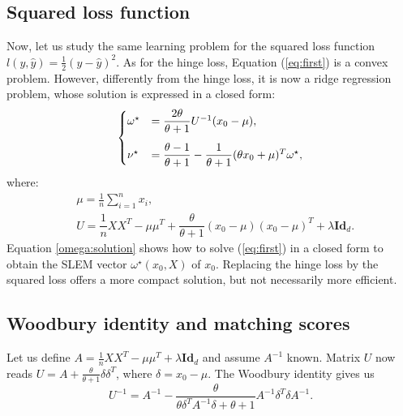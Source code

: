 \subsection{Squared loss function}\label{SLEM}
Now, let us study the same learning problem for the squared loss function $l(y,\hat{y}) = \frac{1}{2}(y-\hat{y})^2$. As for the hinge loss, Equation (\ref{eq:first}) is a convex problem. 
However, differently from the hinge loss, it is now a ridge regression problem, whose solution is expressed in a closed form:
\begin{align}
\begin{cases}
\vspace{3 mm}
\omega^\star &= \dfrac{2\theta}{\theta+1}U^{-1}(x_0-\mu), \\
\nu^\star &= \dfrac{\theta-1}{\theta+1}-\dfrac{1}{\theta+1}(\theta x_0+\mu)^T\omega^\star,
\end{cases}
\label{omega:solution}
\end{align}
where:
\begin{align}
&\mu = \frac{1}{n}\sum_{i=1}^n x_i,\\
&U = \dfrac{1}{n}XX^T-\mu\mu^T+\dfrac{\theta}{\theta+1}(x_0-\mu)(x_0-\mu)^T+\lambda\textbf{Id}_d. \label{eq:U}
\end{align}
Equation \ref{omega:solution} shows how to solve (\ref{eq:first}) in a closed form to obtain the SLEM vector $\omega^\star(x_0,X)$ of $x_0$. 
Replacing the hinge loss by the squared loss offers a more compact solution, but not necessarily more efficient.

\subsection{Woodbury identity and matching scores}
Let us define $A = \frac{1}{n}XX^T-\mu\mu^T +\lambda\textbf{Id}_d$ and assume $A^{-1}$ known. 
Matrix $U$ now reads $U = A + \frac{\theta}{\theta+1}\delta\delta^T$, where $\delta=x_0-\mu$. The Woodbury identity \cite{woodbury} gives us
\begin{equation}
U^{-1} = A^{-1} -\dfrac{\theta}{\theta\delta^TA^{-1}\delta+ \theta+1}A^{-1}\delta^T\delta A^{-1}. \label{invU}
\end{equation}

